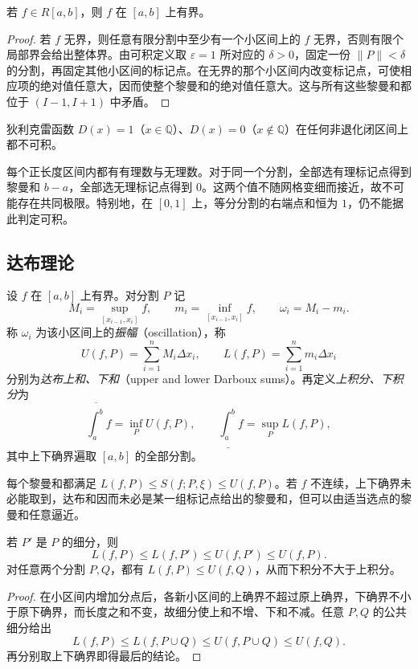\documentclass[UTF8,12pt,a4paper,fontset=fandol]{ctexbook}
\begin{document}
\begin{theorem}
\label{thm:riemann-integrable-implies-bounded}
若 $f\in R[a,b]$，则 $f$ 在 $[a,b]$ 上有界。
\end{theorem}
\begin{proof}
若 $f$ 无界，则任意有限分割中至少有一个小区间上的 $f$ 无界，否则有限个局部界会给出整体界。由可积定义取 $\varepsilon=1$ 所对应的 $\delta>0$，固定一份 $\|P\|<\delta$ 的分割，再固定其他小区间的标记点。在无界的那个小区间内改变标记点，可使相应项的绝对值任意大，因而使整个黎曼和的绝对值任意大。这与所有这些黎曼和都位于 $(I-1,I+1)$ 中矛盾。
\end{proof}

\begin{example}
\label{ex:dirichlet-function-not-riemann-integrable}
狄利克雷函数 $D(x)=1$（$x\in\mathbb Q$）、$D(x)=0$（$x\notin\mathbb Q$）在任何非退化闭区间上都不可积。
\end{example}
\begin{solve}
每个正长度区间内都有有理数与无理数。对于同一个分割，全部选有理标记点得到黎曼和 $b-a$，全部选无理标记点得到 $0$。这两个值不随网格变细而接近，故不可能存在共同极限。特别地，在 $[0,1]$ 上，等分分割的右端点和恒为 $1$，仍不能据此判定可积。
\end{solve}

\subsection{达布理论}
\label{subsec:darboux-theory}

\begin{definition}
\label{def:darboux-sums-and-integrals}
设 $f$ 在 $[a,b]$ 上有界。对分割 $P$ 记
\[
    M_i=\sup_{[x_{i-1},x_i]}f,\qquad
    m_i=\inf_{[x_{i-1},x_i]}f,\qquad \omega_i=M_i-m_i.
\]
称 $\omega_i$ 为该小区间上的\emph{振幅}（oscillation），称
\[
    U(f,P)=\sum_{i=1}^nM_i\Delta x_i,\qquad
    L(f,P)=\sum_{i=1}^nm_i\Delta x_i
\]
分别为\emph{达布上和、下和}（upper and lower Darboux sums）。再定义\emph{上积分、下积分}为
\[
    \overline{\int_a^b}f=\inf_P U(f,P),\qquad
    \underline{\int_a^b}f=\sup_P L(f,P),
\]
其中上下确界遍取 $[a,b]$ 的全部分割。
\end{definition}

每个黎曼和都满足 $L(f,P)\leq S(f;P,\xi)\leq U(f,P)$。若 $f$ 不连续，上下确界未必能取到，达布和因而未必是某一组标记点给出的黎曼和，但可以由适当选点的黎曼和任意逼近。

\begin{proposition}
\label{prop:darboux-refinement}
若 $P'$ 是 $P$ 的细分，则
\[
    L(f,P)\leq L(f,P')\leq U(f,P')\leq U(f,P).
\]
对任意两个分割 $P,Q$，都有 $L(f,P)\leq U(f,Q)$，从而下积分不大于上积分。
\end{proposition}
\begin{proof}
在小区间内增加分点后，各新小区间的上确界不超过原上确界，下确界不小于原下确界，而长度之和不变，故细分使上和不增、下和不减。任意 $P,Q$ 的公共细分给出
\[
    L(f,P)\leq L(f,P\cup Q)\leq U(f,P\cup Q)\leq U(f,Q).
\]
再分别取上下确界即得最后的结论。
\end{proof}
\end{document}
